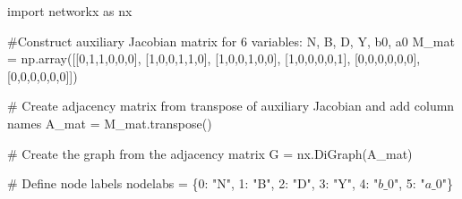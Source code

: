 \documentclass[
  letterpaper,
  DIV=11,
  numbers=noendperiod]{scrreprt}
\newenvironment{Shaded}{\begin{snugshade}}{\end{snugshade}}
\newcommand{\CommentTok}[1]{\textcolor[rgb]{0.37,0.37,0.37}{#1}}
\newcommand{\DecValTok}[1]{\textcolor[rgb]{0.68,0.00,0.00}{#1}}
\newcommand{\ImportTok}[1]{\textcolor[rgb]{0.00,0.46,0.62}{#1}}
\newcommand{\NormalTok}[1]{\textcolor[rgb]{0.00,0.23,0.31}{#1}}
\newcommand{\OperatorTok}[1]{\textcolor[rgb]{0.37,0.37,0.37}{#1}}
\newcommand{\StringTok}[1]{\textcolor[rgb]{0.13,0.47,0.30}{#1}}
\begin{document}
\begin{tcolorbox}[enhanced jigsaw, titlerule=0mm, breakable, bottomrule=.15mm, toprule=.15mm, colbacktitle=quarto-callout-note-color!10!white, rightrule=.15mm, toptitle=1mm, opacityback=0, left=2mm, coltitle=black, title=\textcolor{quarto-callout-note-color}{\faInfo}\hspace{0.5em}{Python code}, colframe=quarto-callout-note-color-frame, opacitybacktitle=0.6, leftrule=.75mm, bottomtitle=1mm, arc=.35mm, colback=white]

\begin{Shaded}
\begin{Highlighting}[]

\ImportTok{import}\NormalTok{ networkx }\ImportTok{as}\NormalTok{ nx}

\CommentTok{\#Construct auxiliary Jacobian matrix for 6 variables: N, B, D, Y, b0, a0}
\NormalTok{M\_mat }\OperatorTok{=}\NormalTok{ np.array([[}\DecValTok{0}\NormalTok{,}\DecValTok{1}\NormalTok{,}\DecValTok{1}\NormalTok{,}\DecValTok{0}\NormalTok{,}\DecValTok{0}\NormalTok{,}\DecValTok{0}\NormalTok{],}
\NormalTok{                  [}\DecValTok{1}\NormalTok{,}\DecValTok{0}\NormalTok{,}\DecValTok{0}\NormalTok{,}\DecValTok{1}\NormalTok{,}\DecValTok{1}\NormalTok{,}\DecValTok{0}\NormalTok{],}
\NormalTok{                  [}\DecValTok{1}\NormalTok{,}\DecValTok{0}\NormalTok{,}\DecValTok{0}\NormalTok{,}\DecValTok{1}\NormalTok{,}\DecValTok{0}\NormalTok{,}\DecValTok{0}\NormalTok{],}
\NormalTok{                  [}\DecValTok{1}\NormalTok{,}\DecValTok{0}\NormalTok{,}\DecValTok{0}\NormalTok{,}\DecValTok{0}\NormalTok{,}\DecValTok{0}\NormalTok{,}\DecValTok{1}\NormalTok{],}
\NormalTok{                  [}\DecValTok{0}\NormalTok{,}\DecValTok{0}\NormalTok{,}\DecValTok{0}\NormalTok{,}\DecValTok{0}\NormalTok{,}\DecValTok{0}\NormalTok{,}\DecValTok{0}\NormalTok{],}
\NormalTok{                  [}\DecValTok{0}\NormalTok{,}\DecValTok{0}\NormalTok{,}\DecValTok{0}\NormalTok{,}\DecValTok{0}\NormalTok{,}\DecValTok{0}\NormalTok{,}\DecValTok{0}\NormalTok{]])}

\CommentTok{\# Create adjacency matrix from transpose of auxiliary Jacobian and add column names}
\NormalTok{A\_mat }\OperatorTok{=}\NormalTok{ M\_mat.transpose()}

\CommentTok{\# Create the graph from the adjacency matrix}
\NormalTok{G }\OperatorTok{=}\NormalTok{ nx.DiGraph(A\_mat)}

\CommentTok{\# Define node labels}
\NormalTok{nodelabs }\OperatorTok{=}\NormalTok{ \{}\DecValTok{0}\NormalTok{: }\StringTok{"N"}\NormalTok{, }\DecValTok{1}\NormalTok{: }\StringTok{"B"}\NormalTok{, }\DecValTok{2}\NormalTok{: }\StringTok{"D"}\NormalTok{, }\DecValTok{3}\NormalTok{: }\StringTok{"Y"}\NormalTok{, }\DecValTok{4}\NormalTok{: }\StringTok{"$b\_0$"}\NormalTok{, }\DecValTok{5}\NormalTok{: }\StringTok{"$a\_0$"}\NormalTok{\}}


\end{Highlighting}
\end{Shaded}
\end{tcolorbox}
\end{document}
